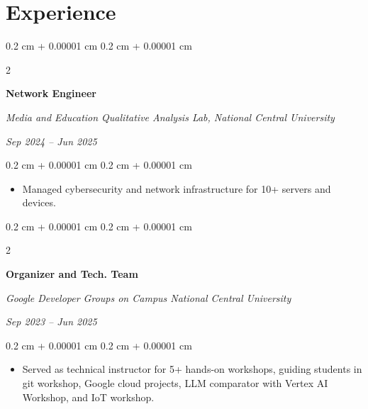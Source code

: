 \documentclass[10pt, letterpaper]{article}
\newenvironment{highlights}{
    \begin{itemize}[
        topsep=0.10 cm,
        parsep=0.10 cm,
        partopsep=0pt,
        itemsep=0pt,
        leftmargin=0.4 cm + 10pt
    ]
}{
    \end{itemize}
} %
\newenvironment{onecolentry}{
    \begin{adjustwidth}{
        0.2 cm + 0.00001 cm
    }{
        0.2 cm + 0.00001 cm
    }
}{
    \end{adjustwidth}
} %
\newenvironment{twocolentry}[2][]{
    \onecolentry
    \def\secondColumn{#2}
    \setcolumnwidth{\fill, 4.5 cm}
    \begin{paracol}{2}
}{
    \switchcolumn \raggedleft \secondColumn
    \end{paracol}
    \endonecolentry
} %
\begin{document}
        


        



    
    \section{Experience}



        
        \begin{twocolentry}[]{
        
            
        \textit{Sep 2024 – Jun 2025}}
            \textbf{Network Engineer}
            
            \textit{Media and Education Qualitative Analysis Lab, National Central University}
        \end{twocolentry}

        \vspace{0.10 cm}
        \begin{onecolentry}
            \begin{highlights}
                \item Managed cybersecurity and network infrastructure for 10+ servers and devices.
            \end{highlights}
        \end{onecolentry}


        \vspace{0.2 cm}

        
        \begin{twocolentry}{ 
            
        \textit{Sep 2023 – Jun 2025}}
            \textbf{Organizer and Tech. Team}
            
            \textit{Google Developer Groups on Campus National Central University}
        \end{twocolentry}

        \vspace{0.10 cm}
        \begin{onecolentry}
            \begin{highlights}
                \item Served as technical instructor for 5+ hands-on workshops, guiding students in git workshop, Google cloud projects, LLM comparator with Vertex AI Workshop, and IoT workshop.
            \end{highlights}
        \end{onecolentry}
\end{document}
